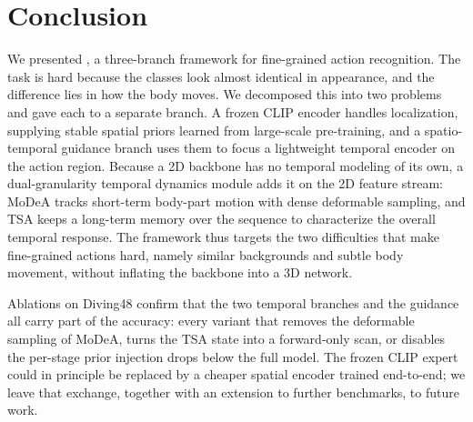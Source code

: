 \section{Conclusion}
\label{sec:conclusion}

We presented \dgtdm, a three-branch framework for fine-grained action
recognition. The task is hard because the classes look almost identical in
appearance, and the difference lies in how the body moves. We decomposed this
into two problems and gave each to a separate branch. A frozen CLIP encoder
handles localization, supplying stable spatial priors learned from
large-scale pre-training, and a spatio-temporal guidance branch uses them to
focus a lightweight temporal encoder on the action region. Because a 2D
backbone has no temporal modeling of its own, a dual-granularity temporal
dynamics module adds it on the 2D feature stream: MoDeA tracks short-term
body-part motion with dense deformable sampling, and TSA keeps a long-term
memory over the sequence to characterize the overall temporal response. The
framework thus targets the two difficulties that make fine-grained actions
hard, namely similar backgrounds and subtle body movement, without inflating
the backbone into a 3D network.

Ablations on Diving48 confirm that the two temporal branches and the guidance
all carry part of the accuracy: every variant that removes the deformable
sampling of MoDeA, turns the TSA state into a forward-only scan, or disables
the per-stage prior injection drops below the full model. The frozen CLIP
expert could in principle be replaced by a cheaper spatial encoder trained
end-to-end; we leave that exchange, together with an extension to further
benchmarks, to future work.
